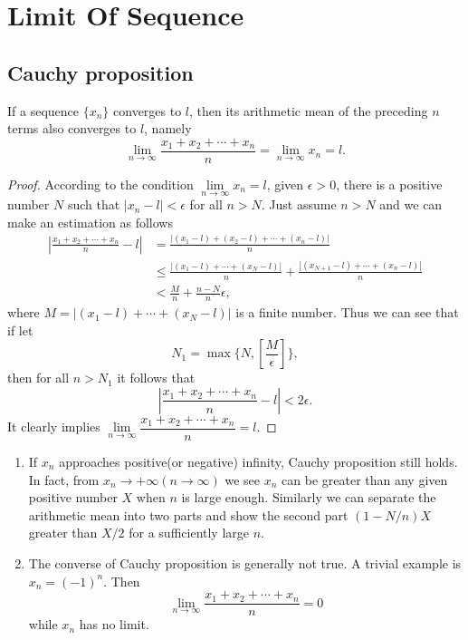 \documentclass[11pt,fleqn]{book} %
\begin{document}
\chapter{Limit Of Sequence}

\section{Cauchy proposition}

\begin{theorem}
    If a sequence $\{x_n\}$ converges to $l$, then its arithmetic mean of the preceding $n$ terms also converges to $l$, namely
    \begin{equation}
    \lim\limits_{n\to\infty}\frac{x_1+x_2+\cdots+x_n}{n}=\lim\limits_{n\to\infty}x_n=l.
    \end{equation}
\end{theorem}

\begin{proof}
	According to the condition $\lim\limits_{n\to\infty}x_n=l$, given $\epsilon>0$, there is a positive number $N$ such that $|x_n-l|<\epsilon$ for all $n>N$. Just assume $n>N$ and we can make an estimation as follows
	\begin{align*}
	\left|\frac{x_1+x_2+\cdots+x_n}{n}-l\right|
	&=\frac{\left|(x_1-l)+(x_2-l)+\cdots+(x_n-l)\right|}{n}\\
	&\leqslant\frac{\left|(x_1-l)+\cdots+(x_N-l)\right|}{n}+\frac{\left|(x_{N+1}-l)+\cdots+(x_n-l)\right|}{n}\\
	&<\frac{M}{n}+\frac{n-N}{n}\epsilon,
	\end{align*}
    where $M=\left|(x_1-l)+\cdots+(x_N-l)\right|$ is a finite number. Thus we can see that if let
	\[
	N_1=\max\{N,\left[\frac{M}{\epsilon}\right]\},
	\]
	then for all $n>N_1$ it follows that
	\[
		\left|\frac{x_1+x_2+\cdots+x_n}{n}-l\right|<2\epsilon.
	\]
	It clearly implies $
	\lim\limits_{n\to\infty}\dfrac{x_1+x_2+\cdots+x_n}{n}=l.
$

\end{proof}

\begin{remark}
    \begin{enumerate}
    \item
	If $x_n$ approaches positive(or negative) infinity, Cauchy proposition still holds. In fact, from $x_n\to+\infty(n\to\infty)$ we see $x_n$ can be greater than any given positive number $X$ when $n$ is large enough. Similarly we can separate the arithmetic mean into two parts and show the second part $(1-N/n)X$ greater than $X/2$ for a sufficiently large $n$.\\
	\item
	The converse of Cauchy proposition is generally not true. A trivial example is $x_n=(-1)^n$. Then
	\[
	\lim\limits_{n\to\infty}\frac{x_1+x_2+\cdots+x_n}{n}=0
	\]
	while $x_n$ has no limit.
    \end{enumerate}
\end{remark}
\end{document}
